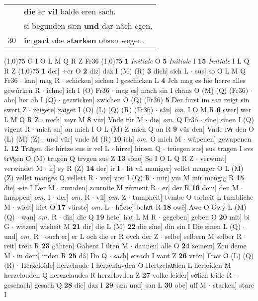 \documentclass[8pt,a4paper,notitlepage]{article}
\begin{document}
\begin{table}[ht]
\begin{minipage}[t]{0.5\linewidth}
\begin{tabular}{rl}
 & \textbf{die} er \textbf{vil} balde eren sach.\\ 
 & si begunden sæn \textbf{und} dar nâch egen,\\ 
30 & \textbf{ir gart} obe \textbf{starken} ohsen wegen.\\ 
\end{tabular}
\scriptsize
\line(1,0){75} \newline
G I O L M Q R Z Fr36 \newline
\line(1,0){75} \newline
\textbf{1} \textit{Initiale} O  \textbf{5} \textit{Initiale} I  \textbf{15} \textit{Initiale} I L Q R Z  \newline
\line(1,0){75} \newline
\textbf{1} der] ÷er O \textbf{2} diz] daz I (M) (R) \textbf{3} dich] sich L  $\cdot$ sus] so O L M Q Fr36  $\cdot$ kan] mag R  $\cdot$ schicken] sichen I geschicken L \textbf{4} Jch mag es hie herre alles gewúrken R  $\cdot$ ichne] ich I (O) Fr36  $\cdot$ mag es] mach sin I chans O (M) (Q) (Fr36)  $\cdot$ abe] her ab I (Q)  $\cdot$ gezwicken] zwichen O (Q) (Fr36) \textbf{5} Der furst im san zeigt sin swert Z  $\cdot$ zeigete] zaiget I (O) (L) (Q) (R) (Fr36)  $\cdot$ sân] \textit{om.} I O M R \textbf{6} swer] wer L M Q R Z  $\cdot$ mich] myr M \textbf{8} vür] Vnde fur M  $\cdot$ die] \textit{om.} Q Fr36  $\cdot$ sîne] sinen I (Q) vigent R  $\cdot$ mich an] an mich I O L (M) Z mich Q an R \textbf{9} vür den] Vnde fvͤr den O (L) (M) (Z)  $\cdot$ und vür] vnde M (R) \textbf{10} ich] \textit{om.} O mich M  $\cdot$ wâpenen] gewapenen L \textbf{12} Truͯgen die hirtze sus ir vel L  $\cdot$ hirze] hirsen Q  $\cdot$ trüegen sus] sus tragen I svs trvͦgen O (M) trugen Q trvgen sus Z \textbf{13} sône] So I O L Q R Z  $\cdot$ verwunt] verwindet M  $\cdot$ ir] sy R (Z) \textbf{14} der] ir I  $\cdot$ lît vil maniger] vellet manger O L (M) (Z) vellet manges Q vellett R  $\cdot$ vor] von I (Q) R  $\cdot$ mir] ym M mir mengig R \textbf{15} die] ÷ie I Der M  $\cdot$ zurnden] zcurnite M zúrnent R  $\cdot$ er] der R \textbf{16} dem] den M  $\cdot$ knappen] \textit{om.} I  $\cdot$ der] \textit{om.} R  $\cdot$ vil] \textit{om.} Z  $\cdot$ tumpheit] tvmbe O torheit L tumbliche M  $\cdot$ wielt] hiet O \textbf{17} vürste] \textit{om.} L  $\cdot$ hüete] behuͯt R \textbf{18} owê] Awe O Owý L (M) (Q)  $\cdot$ wan] \textit{om.} R  $\cdot$ dîn] die Q \textbf{19} hete] hat L M R  $\cdot$ gegeben] geben O \textbf{20} mit] bi G  $\cdot$ witzen] wisheit M \textbf{21} dir] die L (M) \textbf{22} die sîne] din sin I Die sinen L (Q)  $\cdot$ und] \textit{om.} R  $\cdot$ ouch er] er L och die er R ovch der Z  $\cdot$ selbe] selbern M selber R  $\cdot$ reit] treit R \textbf{23} gâhten] Gahent I ilten M  $\cdot$ dannen] alle O \textbf{24} zeinem] Zcu deme M  $\cdot$ in dem] inden R \textbf{25} dâ] Do Q  $\cdot$ sach] ersach I vant Z \textbf{26} vrôn] Frov O (L) (Q) (R)  $\cdot$ Herzeloide] herzelaude I herzenlavden O Hertzelauͯden L herloiden M herzelouden Q herczelaudes R herzelovden Z \textbf{27} volke leider] soͯlich leide R  $\cdot$ geschach] gesach Q \textbf{28} die] daz I \textbf{29} sæn und] san L \textbf{30} obe] uff M  $\cdot$ starken] starc I \newline

\end{minipage}
\end{table}
\end{document}
